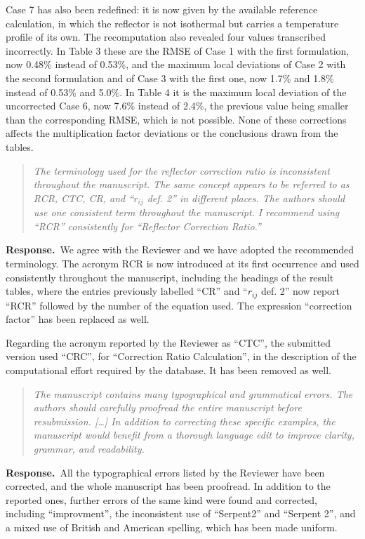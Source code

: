 \documentclass[11pt]{article}
\newenvironment{reviewer}%
  {\medskip\begin{quote}\itshape\color{black!70}}%
  {\end{quote}}
\newcommand{\answer}{\textbf{Response.}\ }
\begin{document}
Case 7 has also been redefined: it is now given by the available reference calculation, in which the reflector is not isothermal but carries a temperature profile of its own. The recomputation also revealed four values transcribed incorrectly. In Table 3 these are the RMSE of Case 1 with the first formulation, now 0.48\% instead of 0.53\%, and the maximum local deviations of Case 2 with the second formulation and of Case 3 with the first one, now 1.7\% and 1.8\% instead of 0.53\% and 5.0\%. In Table 4 it is the maximum local deviation of the uncorrected Case 6, now 7.6\% instead of 2.4\%, the previous value being smaller than the corresponding RMSE, which is not possible. None of these corrections affects the multiplication factor deviations or the conclusions drawn from the tables.

\begin{reviewer}
The terminology used for the reflector correction ratio is inconsistent throughout the manuscript. The same concept appears to be referred to as RCR, CTC, CR, and ``$r_{ij}$ def. 2'' in different places. The authors should use one consistent term throughout the manuscript. I recommend using ``RCR'' consistently for ``Reflector Correction Ratio.''
\end{reviewer}

\answer We agree with the Reviewer and we have adopted the recommended terminology. The acronym RCR is now introduced at its first occurrence and used consistently throughout the manuscript, including the headings of the result tables, where the entries previously labelled ``CR'' and ``$r_{ij}$ def. 2'' now report ``RCR'' followed by the number of the equation used. The expression ``correction factor'' has been replaced as well.

Regarding the acronym reported by the Reviewer as ``CTC'', the submitted version used ``CRC'', for ``Correction Ratio Calculation'', in the description of the computational effort required by the database. It has been removed as well.

\begin{reviewer}
The manuscript contains many typographical and grammatical errors. The authors should carefully proofread the entire manuscript before resubmission. [\ldots] In addition to correcting these specific examples, the manuscript would benefit from a thorough language edit to improve clarity, grammar, and readability.
\end{reviewer}

\answer All the typographical errors listed by the Reviewer have been corrected, and the whole manuscript has been proofread. In addition to the reported ones, further errors of the same kind were found and corrected, including ``improvment'', the inconsistent use of ``Serpent2'' and ``Serpent 2'', and a mixed use of British and American spelling, which has been made uniform.
\end{document}
